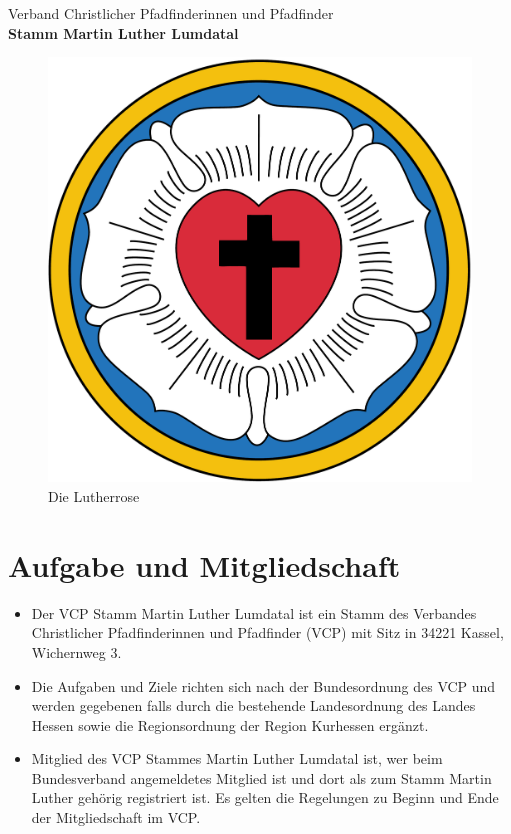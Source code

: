 \documentclass[a4paper]{article}
\begin{document}
\begin{center}
    \normalsize{Verband Christlicher Pfadfinderinnen und Pfadfinder}\\
	\Huge{\textbf{Stamm Martin Luther Lumdatal}}
\end{center}


\clearpage
\tableofcontents 
\clearpage

    \begin{figure}
        \vspace{-10pt}
        \centering
        \includegraphics[width=1\linewidth]{Lutherrose.pdf}
        \caption{Die Lutherrose}
        \label{lutherrose}
    \end{figure}
    
\section{Aufgabe und Mitgliedschaft} %
\label{sec:aufgabe_und_mitgliedschaft}
	\begin{itemize}
		\item Der VCP Stamm Martin Luther Lumdatal ist ein Stamm des Verbandes Christlicher Pfadfinderinnen und Pfadfinder (VCP) mit Sitz in 34221 Kassel, Wichernweg 3. 
		\item Die Aufgaben und Ziele richten sich nach der Bundesordnung des VCP und werden gegebenen falls durch die bestehende Landesordnung des Landes Hessen sowie die Regionsordnung der Region Kurhessen ergänzt. 
		\item Mitglied des VCP Stammes Martin Luther Lumdatal ist, wer beim Bundesverband angemeldetes Mitglied ist und dort als zum Stamm Martin Luther gehörig registriert ist. Es gelten die Regelungen zu Beginn und Ende der Mitgliedschaft im VCP. 
	\end{itemize}
\end{document}
